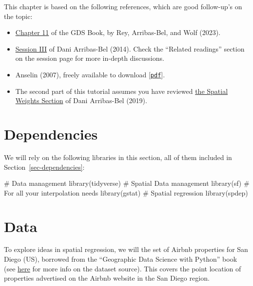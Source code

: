 \documentclass[
  letterpaper,
  DIV=11,
  numbers=noendperiod,
  oneside]{scrreprt}
\newenvironment{Shaded}{\begin{snugshade}}{\end{snugshade}}
\newcommand{\CommentTok}[1]{\textcolor[rgb]{0.37,0.37,0.37}{#1}}
\newcommand{\FunctionTok}[1]{\textcolor[rgb]{0.28,0.35,0.67}{#1}}
\newcommand{\NormalTok}[1]{\textcolor[rgb]{0.00,0.23,0.31}{#1}}
\providecommand{\tightlist}{%
  \setlength{\itemsep}{0pt}\setlength{\parskip}{0pt}}\usepackage{longtable,booktabs,array}
\begin{document}
This chapter is based on the following references, which are good
follow-up's on the topic:

\begin{itemize}
\tightlist
\item
  \href{https://geographicdata.science/book/notebooks/11_regression.html}{Chapter
  11} of the GDS Book, by Rey, Arribas-Bel, and Wolf (2023).
\item
  \href{http://darribas.org/sdar_mini/notes/Class_03.html}{Session III}
  of Dani Arribas-Bel (2014). Check the ``Related readings'' section on
  the session page for more in-depth discussions.
\item
  Anselin (2007), freely available to download
  {[}\href{https://dces.wisc.edu/wp-content/uploads/sites/128/2013/08/W14_Anselin2007.pdf}{\texttt{pdf}}{]}.
\item
  The second part of this tutorial assumes you have reviewed
  \href{https://darribas.org/gds_course/content/bE/concepts_E.html}{the
  Spatial Weights Section} of Dani Arribas-Bel (2019).
\end{itemize}

\section{Dependencies}\label{dependencies-3}

We will rely on the following libraries in this section, all of them
included in Section~\ref{sec-dependencies}:

\begin{Shaded}
\begin{Highlighting}[]
\CommentTok{\# Data management}
\FunctionTok{library}\NormalTok{(tidyverse)}
\CommentTok{\# Spatial Data management}
\FunctionTok{library}\NormalTok{(sf)}
\CommentTok{\# For all your interpolation needs}
\FunctionTok{library}\NormalTok{(gstat)}
\CommentTok{\# Spatial regression}
\FunctionTok{library}\NormalTok{(spdep)}
\end{Highlighting}
\end{Shaded}

\section{Data}\label{data-2}

To explore ideas in spatial regression, we will the set of Airbnb
properties for San Diego (US), borrowed from the ``Geographic Data
Science with Python'' book (see
\href{https://geographicdata.science/book/data/airbnb/regression_cleaning.html}{here}
for more info on the dataset source). This covers the point location of
properties advertised on the Airbnb website in the San Diego region.
\end{document}
